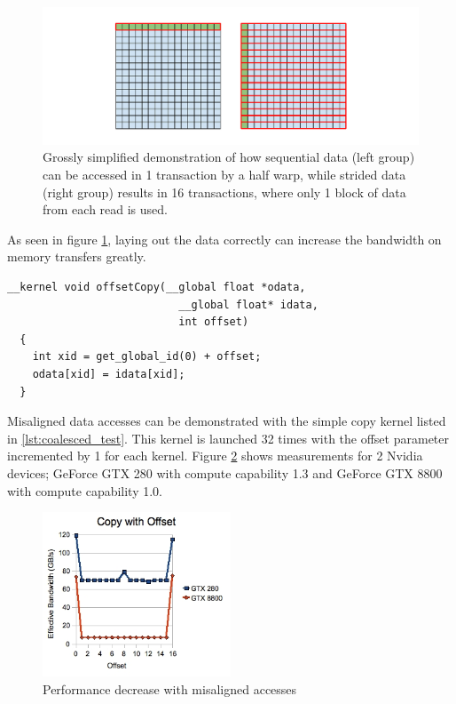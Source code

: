 \begin{figure}[h]
  \includegraphics[width=\textwidth]{images/coalesced-access.pdf}
  \caption{Grossly simplified demonstration of how sequential data
    (left group) can be accessed in 1 transaction by a half warp,
    while strided data (right group) results in 16 transactions, where
    only 1 block of data from each read is used.}
  \label{fig:execution-model-figure}
\end{figure}

As seen in figure \ref{fig:execution-model-figure}, laying out the
data correctly can increase the bandwidth on memory transfers greatly.

\begin{lstlisting}[label={lst:coalesced_test}, caption=Copy kernel
  with offset argument]
  __kernel void offsetCopy(__global float *odata,
                           __global float* idata,
                           int offset)
  {
    int xid = get_global_id(0) + offset;
    odata[xid] = idata[xid];
  }
\end{lstlisting}

Misaligned data accesses can be demonstrated with the simple copy
kernel listed in \ref{lst:coalesced_test}. This kernel is launched 32
times with the offset parameter incremented by 1 for each kernel.
Figure \ref{fig:coalesced-performance} shows measurements for 2 Nvidia
devices; GeForce GTX 280 with compute capability 1.3 and GeForce GTX
8800 with compute capability 1.0.

\begin{figure}[h]
  \centering
  \includegraphics[width=0.5\textwidth]{images/coalesced-performance.png}
  \caption{Performance decrease with misaligned accesses}
  \label{fig:coalesced-performance}
\end{figure}

